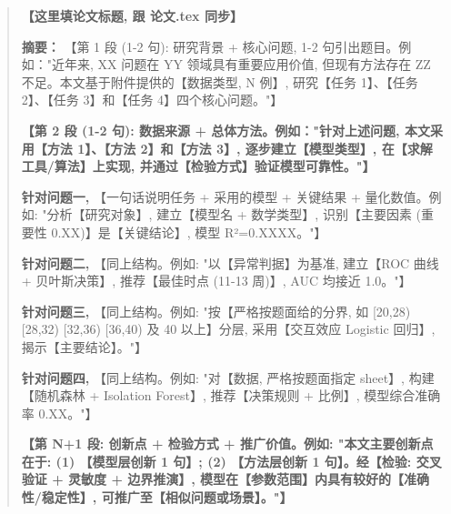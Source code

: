 \begin{abstract}


\textbf{【这里填论文标题, 跟 论文.tex 同步】}

\textbf{摘要：} 【第 1 段 (1-2 句): 研究背景 + 核心问题, 1-2 句引出题目。例如："近年来, XX 问题在 YY 领域具有重要应用价值, 但现有方法存在 ZZ 不足。本文基于附件提供的【数据类型, N 例】, 研究【任务 1】、【任务 2】、【任务 3】和【任务 4】四个核心问题。"】

\textbf{【第 2 段 (1-2 句): 数据来源 + 总体方法。例如："针对上述问题, 本文采用【方法 1】、【方法 2】和【方法 3】, 逐步建立【模型类型】, 在【求解工具/算法】上实现, 并通过【检验方式】验证模型可靠性。"】}

\textbf{针对问题一, }【一句话说明任务 + 采用的模型 + 关键结果 + 量化数值。例如: "分析【研究对象】, 建立【模型名 + 数学类型】, 识别【主要因素 (重要性 0.XX)】是【关键结论】, 模型 R²=0.XXXX。"】

\textbf{针对问题二, }【同上结构。例如: "以【异常判据】为基准, 建立【ROC 曲线 + 贝叶斯决策】, 推荐【最佳时点 (11-13 周)】, AUC 均接近 1.0。"】

\textbf{针对问题三, }【同上结构。例如: "按【严格按题面给的分界, 如 [20,28) [28,32) [32,36) [36,40) 及 40 以上】分层, 采用【交互效应 Logistic 回归】, 揭示【主要结论】。"】

\textbf{针对问题四, }【同上结构。例如: "对【数据, 严格按题面指定 sheet】, 构建【随机森林 + Isolation Forest】, 推荐【决策规则 + 比例】, 模型综合准确率 0.XX。"】

\textbf{【第 N+1 段: 创新点 + 检验方式 + 推广价值。例如: "本文主要创新点在于: (1) 【模型层创新 1 句】; (2) 【方法层创新 1 句】。经【检验: 交叉验证 + 灵敏度 + 边界推演】, 模型在【参数范围】内具有较好的【准确性/稳定性】, 可推广至【相似问题或场景】。"】}


\end{abstract}
